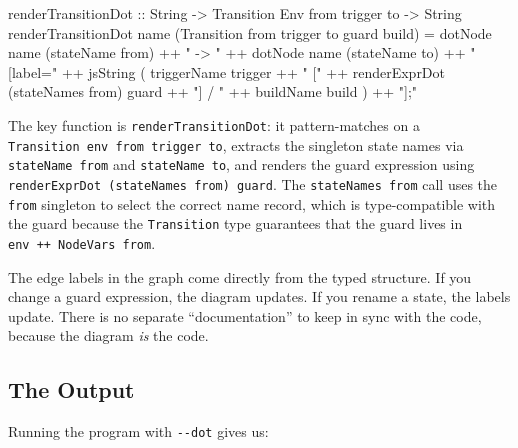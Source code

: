 \documentclass[]{article}
\newenvironment{Shaded}{}{}
\newcommand{\DataTypeTok}[1]{\textcolor[rgb]{0.56,0.13,0.00}{#1}}
\newcommand{\NormalTok}[1]{#1}
\newcommand{\OperatorTok}[1]{\textcolor[rgb]{0.40,0.40,0.40}{#1}}
\newcommand{\OtherTok}[1]{\textcolor[rgb]{0.00,0.44,0.13}{#1}}
\newcommand{\StringTok}[1]{\textcolor[rgb]{0.25,0.44,0.63}{#1}}
\begin{document}
\begin{Shaded}
\begin{Highlighting}[]
\OtherTok{renderTransitionDot ::} \DataTypeTok{String} \OtherTok{{-}\textgreater{}} \DataTypeTok{Transition} \DataTypeTok{Env}\NormalTok{ from trigger to }\OtherTok{{-}\textgreater{}} \DataTypeTok{String}
\NormalTok{renderTransitionDot name (}\DataTypeTok{Transition}\NormalTok{ from trigger to guard build) }\OtherTok{=}
\NormalTok{  dotNode name (stateName from)}
    \OperatorTok{++} \StringTok{" {-}\textgreater{} "}
    \OperatorTok{++}\NormalTok{ dotNode name (stateName to)}
    \OperatorTok{++} \StringTok{" [label="}
    \OperatorTok{++}\NormalTok{ jsString}
\NormalTok{      ( triggerName trigger}
          \OperatorTok{++} \StringTok{" ["}
          \OperatorTok{++}\NormalTok{ renderExprDot (stateNames from) guard}
          \OperatorTok{++} \StringTok{"] / "}
          \OperatorTok{++}\NormalTok{ buildName build}
\NormalTok{      )}
    \OperatorTok{++} \StringTok{"];"}
\end{Highlighting}
\end{Shaded}

The key function is \texttt{renderTransitionDot}: it pattern-matches on a
\texttt{Transition\ env\ from\ trigger\ to}, extracts the singleton state names
via \texttt{stateName\ from} and \texttt{stateName\ to}, and renders the guard
expression using \texttt{renderExprDot\ (stateNames\ from)\ guard}. The
\texttt{stateNames\ from} call uses the \texttt{from} singleton to select the
correct name record, which is type-compatible with the guard because the
\texttt{Transition} type guarantees that the guard lives in
\texttt{env\ ++\ NodeVars\ from}.

The edge labels in the graph come directly from the typed structure. If you
change a guard expression, the diagram updates. If you rename a state, the
labels update. There is no separate ``documentation'' to keep in sync with the
code, because the diagram \emph{is} the code.

\subsection{The Output}\label{the-output}

Running the program with \texttt{-\/-dot} gives us:
\end{document}
